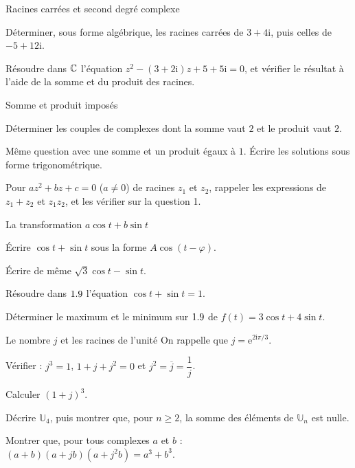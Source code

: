 \begin{exercice}[2]{Racines carrées et second degré complexe}
\begin{questions}
  \item Déterminer, sous forme algébrique, les racines carrées de
    $3+4\mathrm{i}$, puis celles de $-5+12\mathrm{i}$.
  \item Résoudre dans $\mathbb{C}$ l'équation
    $z^{2}-(3+2\mathrm{i})z+5+5\mathrm{i}=0$, et vérifier le résultat à
    l'aide de la somme et du produit des racines.
\end{questions}
\end{exercice}

\begin{exercice}[2]{Somme et produit imposés}
\begin{questions}
  \item Déterminer les couples de complexes dont la somme vaut $2$ et le
    produit vaut $2$.
  \item Même question avec une somme et un produit égaux à $1$. Écrire les
    solutions sous forme trigonométrique.
  \item Pour $az^{2}+bz+c=0$ ($a\neq0$) de racines $z_1$ et $z_2$, rappeler
    les expressions de $z_1+z_2$ et $z_1z_2$, et les vérifier sur la
    question 1.
\end{questions}
\end{exercice}

\begin{exercice}[2]{La transformation $a\cos t+b\sin t$}
\begin{questions}
  \item Écrire $\cos t+\sin t$ sous la forme $A\cos(t-\varphi)$.
  \item Écrire de même $\sqrt3\cos t-\sin t$.
  \item Résoudre dans $1.9$ l'équation $\cos t+\sin t=1$.
  \item Déterminer le maximum et le minimum sur $1.9$ de
    $f(t)=3\cos t+4\sin t$.
\end{questions}
\end{exercice}

\begin{exercice}[2]{Le nombre $j$ et les racines de l'unité}
On rappelle que $j=\mathrm{e}^{2\mathrm{i}\pi/3}$.
\begin{questions}
  \item Vérifier : $j^{3}=1$, $1+j+j^{2}=0$ et $j^{2}=\overline{j}=\dfrac1j$.
  \item Calculer $(1+j)^{3}$.
  \item Décrire $\mathbb{U}_4$, puis montrer que, pour $n\geq2$, la somme des
    éléments de $\mathbb{U}_n$ est nulle.
  \item Montrer que, pour tous complexes $a$ et $b$ :
    $(a+b)(a+jb)(a+j^{2}b)=a^{3}+b^{3}$.
\end{questions}
\end{exercice}

